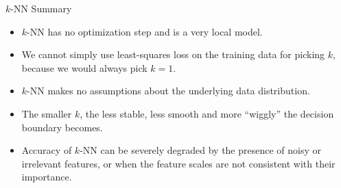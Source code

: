 \documentclass[11pt,compress,t,notes=noshow, xcolor=table]{beamer}
\begin{document}
\begin{vbframe}{$k$-NN Summary}

\begin{itemize}
\item $k$-NN has no optimization step and is a very local model.
\item We cannot simply use least-squares loss on the training data for picking $k$,
  because we would always pick $k=1$.
\item $k$-NN makes no assumptions about the underlying data distribution.
\item The smaller $k$, the less stable, less smooth and more \enquote{wiggly} the decision
  boundary becomes.
\item Accuracy of $k$-NN can be severely degraded by the presence of noisy or irrelevant features,
  or when the feature scales are not consistent with their importance.
\end{itemize}


% 
% 
% 
% 
% 
% 

\end{vbframe}
\end{document}
